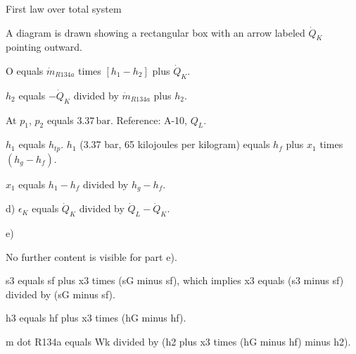 First law over total system  

A diagram is drawn showing a rectangular box with an arrow labeled \( \dot{Q}_K \) pointing outward.  

O equals \( \dot{m}_{R134a} \) times \( [h_1 - h_2] \) plus \( \dot{Q}_K \).  

\( h_2 \) equals \( - \dot{Q}_K \) divided by \( \dot{m}_{R134a} \) plus \( h_2 \).  

At \( p_1 \), \( p_2 \) equals \( 3.37 \, \text{bar} \).  
Reference: A-10, \( Q_{L} \).  

\( h_1 \) equals \( h_{tp} \).  
\( h_1 \) (3.37 bar, 65 kilojoules per kilogram) equals \( h_f \) plus \( x_1 \) times \( (h_g - h_f) \).  

\( x_1 \) equals \( h_1 - h_f \) divided by \( h_g - h_f \).  

d)  
\( \epsilon_K \) equals \( \dot{Q}_K \) divided by \( \dot{Q}_{L} - \dot{Q}_K \).  

e)  

No further content is visible for part e).

s3 equals sf plus x3 times (sG minus sf), which implies x3 equals (s3 minus sf) divided by (sG minus sf).  

h3 equals hf plus x3 times (hG minus hf).  

m dot R134a equals Wk divided by (h2 plus x3 times (hG minus hf) minus h2).